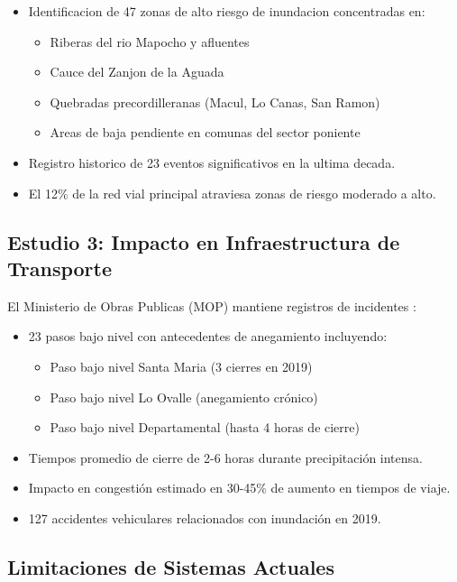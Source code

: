 \documentclass[conference]{IEEEtran}
\begin{document}
\begin{itemize}
    \item Identificacion de 47 zonas de alto riesgo de inundacion concentradas en:
    \begin{itemize}
        \item Riberas del rio Mapocho y afluentes
        \item Cauce del Zanjon de la Aguada
        \item Quebradas precordilleranas (Macul, Lo Canas, San Ramon)
        \item Areas de baja pendiente en comunas del sector poniente
    \end{itemize}
    \item Registro historico de 23 eventos significativos en la ultima decada.
    \item El 12\% de la red vial principal atraviesa zonas de riesgo moderado a alto.
\end{itemize}

\subsection{Estudio 3: Impacto en Infraestructura de Transporte}

El Ministerio de Obras Publicas (MOP) mantiene registros de incidentes \cite{mop2019}:

\begin{itemize}
    \item 23 pasos bajo nivel con antecedentes de anegamiento incluyendo:
    \begin{itemize}
        \item Paso bajo nivel Santa Maria (3 cierres en 2019)
        \item Paso bajo nivel Lo Ovalle (anegamiento crónico)
        \item Paso bajo nivel Departamental (hasta 4 horas de cierre)
    \end{itemize}
    \item Tiempos promedio de cierre de 2-6 horas durante precipitación intensa.
    \item Impacto en congestión estimado en 30-45\% de aumento en tiempos de viaje.
    \item 127 accidentes vehiculares relacionados con inundación en 2019.
\end{itemize}

\subsection{Limitaciones de Sistemas Actuales}
\end{document}
